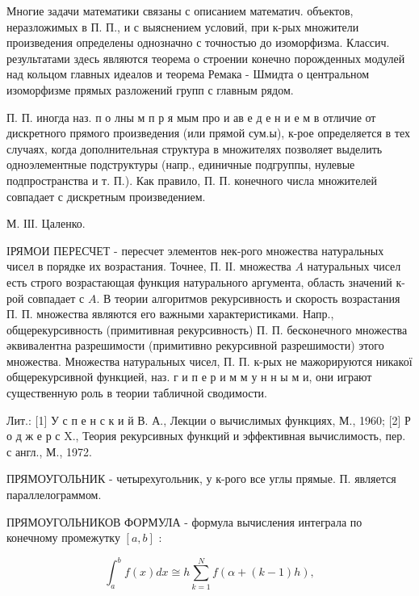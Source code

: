 \documentclass[10pt]{article}
\begin{document}
Многие задачи математики связаны с описанием математич. объектов, неразложимых в П. П., и с выяснением условий, при к-рых множители произведения определены однозначно с точностью до изоморфизма. Классич. результатами здесь являются теорема о строении конечно порожденных модулей над кольцом главных идеалов и теорема Ремака - Шмидта о центральном изоморфизме прямых разложений групп с главным рядом.



П. П. иногда наз. п о лны м п р я мым про и ав е д е н и е м в отличие от дискретного прямого произведения (или прямой сум.ы), к-рое определяется в тех случаях, когда дополнительная структура в множителях позволяет выделить одноэлементные подструктуры (напр., единичные подгруппы, нулевые подпространства и т. П.). Как правило, П. П. конечного числа множителей совпадает с дискретным произведением.



М. ІІІ. Цаленко.



ІРЯМОИ ПЕРЕСЧЕТ - пересчет элементов нек-рого множества натуральных чисел в порядке их возрастания. Точнее, П. ІІ. множества $A$ натуральных чисел есть строго возрастающая функция натурального аргумента, область значений к-рой совпадает с $A$. В теории алгоритмов рекурсивность и скорость возрастания П. П. множества являются его важными характеристиками. Напр., общерекурсивность (примитивная рекурсивность) П. П. бесконечного множества әквивалентна разрешимости (примитивно рекурсивной разрешимости) этого множества. Множества натуральных чисел, П. П. к-рых не мажорируются никакої общерекурсивной функцией, наз. г и п е р и м м у н н ы м и, они играют существенную роль в теории табличной сводимости.



Лит.: [1] У с п е н с к и й В. А., Лекции о вычислимых функциях, М., 1960; [2] Р о д ж е р с X., Теория рекурсивных функций и эффективная вычислимость, пер. с англ., М., 1972.



ПРЯМОУГОЛЬНИК - четырехугольник, у к-рого все углы прямые. П. является параллелограммом.



ПРЯМОУГОЛЬНИКОВ ФОРМУЛА - формула вычисления интеграла по конечному промежутку $[a, b]$ :



\[

\int_{a}^{b} f(x) d x \cong h \sum_{k=1}^{N} f(\alpha+(k-1) h),

\]
\end{document}
